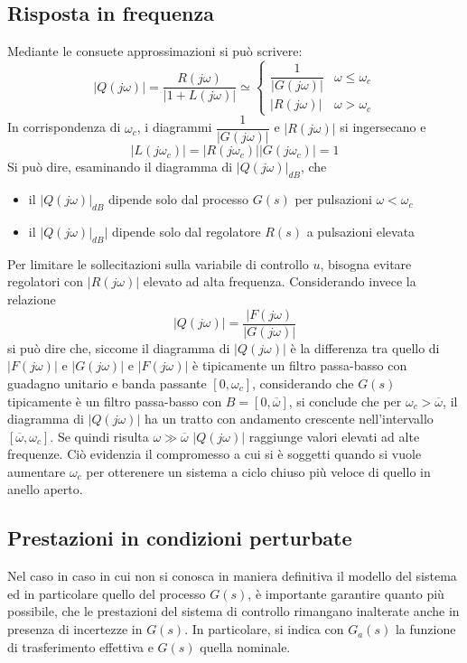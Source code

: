 \documentclass[a4paper]{report}
\begin{document}
\subsection{Risposta in frequenza}
Mediante le consuete approssimazioni si pu\`o scrivere:
\[
|Q(j \omega)| = \dfrac{R(j \omega)}{|1 + L(j \omega)|} \simeq
\left \{
\begin{array}{ll}
  \dfrac{1}{|G(j \omega)|} & \omega \leq \omega_c\\
  |R(j \omega)| & \omega > \omega_c
\end{array}
\right .
\]
In corrispondenza di $\omega_c$, i diagrammi $\dfrac{1}{|G(j
  \omega)|}$ e $|R(j \omega)|$ si ingersecano e
\[
|L(j \omega_c)| = |R(j \omega_c)| |G(j \omega_c)| = 1
\]
Si pu\`o dire, esaminando il diagramma di $|Q(j \omega)|_{dB}$, che
\begin{itemize}
\item il $|Q(j \omega)|_{dB}$ dipende solo dal processo $G(s)$ per
  pulsazioni $\omega < \omega_c$
\item il $|Q(j \omega)|_{dB}|$ dipende solo dal regolatore $R(s)$ a
  pulsazioni elevata
\end{itemize}
Per limitare le sollecitazioni sulla variabile di controllo $u$,
bisogna evitare regolatori con $|R(j \omega)|$ elevato ad alta
frequenza. Considerando invece la relazione
\[
|Q(j \omega)| = \dfrac{|F(j \omega)}{|G(j \omega)|}
\]
si pu\`o dire che, siccome il diagramma di $|Q(j \omega)|$ \`e la
differenza tra quello di $|F(j \omega)|$ e $|G(j \omega)|$ e $|F(j
\omega)|$ \`e tipicamente un filtro passa-basso con guadagno unitario
e banda passante $[0, \omega_c]$, considerando che $G(s)$ tipicamente
\`e un filtro passa-basso con $B = [0, \overline{\omega}]$, si
conclude che per $\omega_c > \overline{\omega}$, il diagramma di $|Q(j
\omega)|$ ha un tratto con andamento crescente nell'intervallo
$[\overline{\omega}, \omega_c]$. Se quindi risulta $\omega \gg
\overline{\omega}$ $|Q(j \omega)|$ raggiunge valori elevati ad alte
frequenze. Ci\`o evidenzia il compromesso a cui si \`e soggetti quando
si vuole aumentare $\omega_c$ per otterenere un sistema a ciclo chiuso
pi\`u veloce di quello in anello aperto.
\subsection{Prestazioni in condizioni perturbate}
Nel caso in caso in cui non si conosca in maniera definitiva il
modello del sistema ed in particolare quello del processo $G(s)$, \`e
importante garantire quanto pi\`u possibile, che le prestazioni del
sistema di controllo rimangano inalterate anche in presenza di
incertezze in $G(s)$. In particolare, si indica con $G_a(s)$ la
funzione di trasferimento effettiva e $G(s)$ quella nominale.
\end{document}
